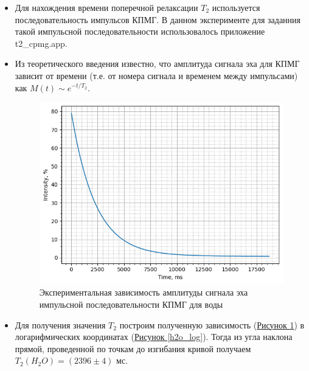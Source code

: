 \documentclass{article}
\begin{document}
\begin{itemize}

\item Для нахождения времени поперечной релаксации $T_2$ используется последовательность импульсов КПМГ. В данном эксперименте для заданния такой импульсной последовательности использовалось приложение t2\_cpmg.app. 

\item Из теоретического введения известно, что амплитуда сигнала эха для КПМГ зависит от времени (т.е. от номера сигнала и временем между импульсами) как $M(t) \sim e^{-t/T_2}$. 

\begin{figure}[h!]
    \centering
    \includegraphics[scale = 0.7]{graphs/cmpg_h20.png}
    \caption{Экспериментальная зависимость амплитуды сигнала эха импульсной последовательности КПМГ для воды}
    \label{h2o}
\end{figure}

\item Для получения значения $T_2$ построим полученную зависимость (\hyperref[h20]{Рисунок \ref*{h2o}}) в логарифмических координатах (\hyperref[h2o_log]{Рисунок \ref*{h2o_log}}). Тогда из угла наклона прямой, проведенной по точкам до изгибания кривой получаем $T_2(H_2O)=(2396\pm4)$ мс.




\end{itemize}
\end{document}
